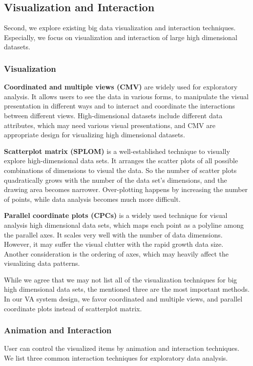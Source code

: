 \documentclass[journal]{vgtc}                %
\begin{document}
{\subsection{Visualization and Interaction}
Second, we explore existing big data visualization and interaction techniques. Especially, we focus on visualization and  interaction of large high dimensional datasets.

\subsubsection{Visualization}
\textbf{Coordinated and multiple views (CMV)} \cite{roberts2007state} are widely used for exploratory analysis. It allows users to see the data in various forms, to manipulate the visual presentation in different ways and to interact and coordinate the interactions between different views.  High-dimensional datasets include different data attributes, which may need various visual presentations, and CMV are appropriate design for visualizing high dimensional datasets.

\textbf{Scatterplot matrix (SPLOM)} \cite{elmqvist2008rolling} is a well-established technique to visually explore high-dimensional data sets. It arranges the scatter plots of all possible combinations of dimensions to visual the data. So the number of scatter plots quadratically grows with the number of the data set's dimensions, and the drawing area becomes narrower. Over-plotting happens by increasing the number of points, while data analysis becomes much more difficult.


\textbf{Parallel coordinate plots (CPCs)} is a widely used technique for visual analysis high dimensional data sets, which maps each point as a polyline among the parallel axes. It scales very well with the number of data dimensions. However, it may suffer the visual clutter with the rapid growth data size. Another consideration is the ordering of axes, which may heavily affect the visualizing data patterns.

While we agree that we may not list all of the visualization techniques for big high dimensional data sets, the mentioned three are the most important methods. In our VA system design,  we favor coordinated and multiple views, and parallel coordinate plots instead of scatterplot matrix. 

\subsubsection{Animation and Interaction}
User can control the visualized items by animation and interaction techniques. We list three common interaction techniques for exploratory data analysis.

}
\end{document}
